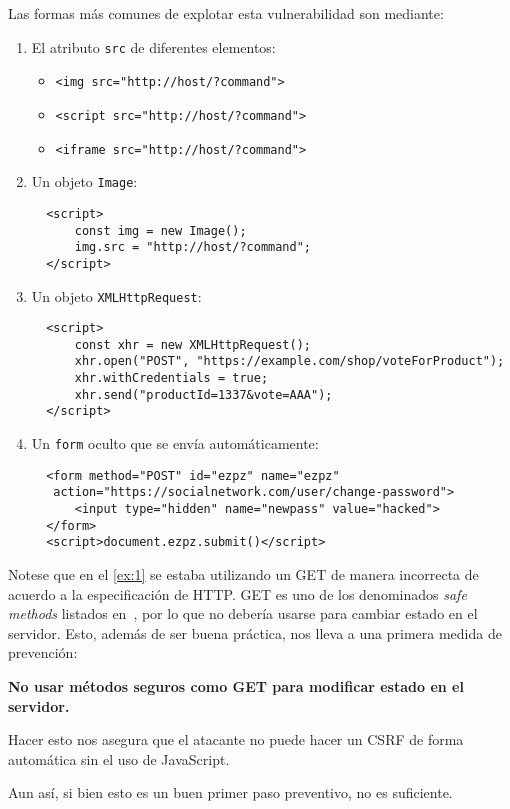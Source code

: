 \documentclass{article}
\theoremstyle{definition}
\begin{document}
Las formas más comunes de explotar esta vulnerabilidad son mediante:
\begin{enumerate}
  \itemsep 0cm
\item El atributo \verb+src+ de diferentes elementos:
\begin{itemize}
	\item \verb+<img src="http://host/?command">+
	\item \verb+<script src="http://host/?command">+
	\item \verb+<iframe src="http://host/?command">+
\end{itemize}
\item Un objeto \verb+Image+:
  \begin{verbatim}
  <script>
      const img = new Image();
      img.src = "http://host/?command";
  </script>
  \end{verbatim}
\item Un objeto \verb+XMLHttpRequest+:
  \begin{verbatim}
  <script>
      const xhr = new XMLHttpRequest();
      xhr.open("POST", "https://example.com/shop/voteForProduct");
      xhr.withCredentials = true;
      xhr.send("productId=1337&vote=AAA");
  </script>
  \end{verbatim}
\item Un \verb+form+ oculto que se envía automáticamente:
  \begin{verbatim}
  <form method="POST" id="ezpz" name="ezpz"
   action="https://socialnetwork.com/user/change-password">
      <input type="hidden" name="newpass" value="hacked">
  </form>
  <script>document.ezpz.submit()</script>
  \end{verbatim}
\end{enumerate}

Notese que en el \autoref{ex:1} se estaba utilizando un GET de manera
incorrecta de acuerdo a la especificación de HTTP\@. GET es uno de los
denominados \textit{safe methods} listados en~\cite{rfc7231}, por lo que no
debería usarse para cambiar estado en el servidor. Esto, además de ser buena
práctica, nos lleva a una primera medida de prevención:

\begin{center}
\textbf{No usar métodos seguros como GET para modificar estado en el
servidor.}
\end{center}

Hacer esto nos asegura que el atacante no puede hacer un CSRF de forma
automática sin el uso de JavaScript.

Aun así, si bien esto es un buen primer paso preventivo, no es suficiente.
\end{document}
